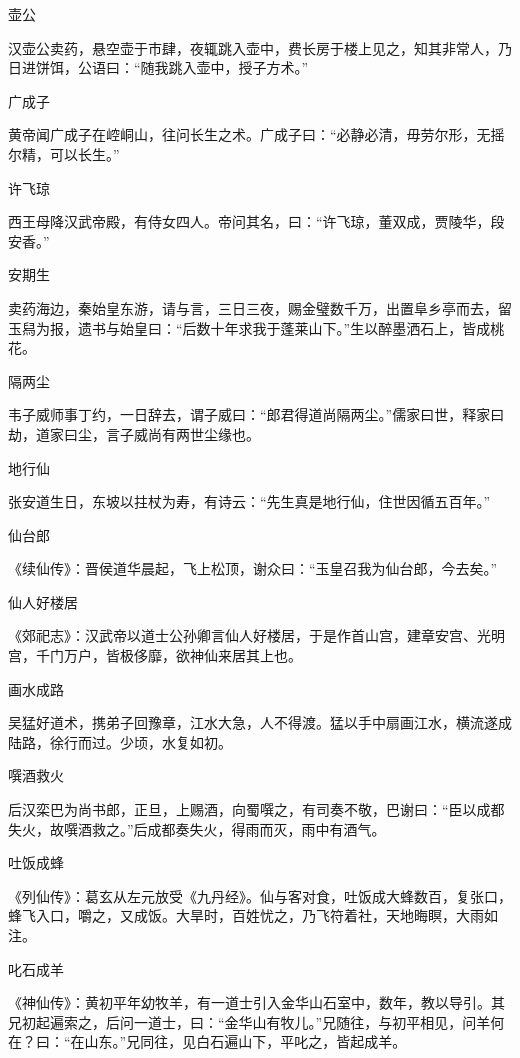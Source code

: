 \documentclass[a4paper,12pt,UTF8,twoside]{ctexbook}
\begin{document}
    壶公
    
    汉壶公卖药，悬空壶于市肆，夜辄跳入壶中，费长房于楼上见之，知其非常人，乃日进饼饵，公语曰：“随我跳入壶中，授子方术。”
    
    广成子
    
    黄帝闻广成子在崆峒山，往问长生之术。广成子曰：“必静必清，毋劳尔形，无摇尔精，可以长生。”
    
    许飞琼
    
    西王母降汉武帝殿，有侍女四人。帝问其名，曰：“许飞琼，董双成，贾陵华，段安香。”
    
    安期生
    
    卖药海边，秦始皇东游，请与言，三日三夜，赐金璧数千万，出置阜乡亭而去，留玉舄为报，遗书与始皇曰：“后数十年求我于蓬莱山下。”生以醉墨洒石上，皆成桃花。
    
    隔两尘
    
    韦子威师事丁约，一日辞去，谓子威曰：“郎君得道尚隔两尘。”儒家曰世，释家曰劫，道家曰尘，言子威尚有两世尘缘也。
    
    地行仙
    
    张安道生日，东坡以拄杖为寿，有诗云：“先生真是地行仙，住世因循五百年。”
    
    仙台郎
    
    《续仙传》：晋侯道华晨起，飞上松顶，谢众曰：“玉皇召我为仙台郎，今去矣。”
    
    仙人好楼居
    
    《郊祀志》：汉武帝以道士公孙卿言仙人好楼居，于是作首山宫，建章安宫、光明宫，千门万户，皆极侈靡，欲神仙来居其上也。
    
    画水成路
    
    吴猛好道术，携弟子回豫章，江水大急，人不得渡。猛以手中扇画江水，横流遂成陆路，徐行而过。少顷，水复如初。
    
    噀酒救火
    
    后汉栾巴为尚书郎，正旦，上赐酒，向蜀噀之，有司奏不敬，巴谢曰：“臣以成都失火，故噀酒救之。”后成都奏失火，得雨而灭，雨中有酒气。
    
    吐饭成蜂
    
    《列仙传》：葛玄从左元放受《九丹经》。仙与客对食，吐饭成大蜂数百，复张口，蜂飞入口，嚼之，又成饭。大旱时，百姓忧之，乃飞符着社，天地晦瞑，大雨如注。
    
    叱石成羊
    
    《神仙传》：黄初平年幼牧羊，有一道士引入金华山石室中，数年，教以导引。其兄初起遍索之，后问一道士，曰：“金华山有牧儿。”兄随往，与初平相见，问羊何在？曰：“在山东。”兄同往，见白石遍山下，平叱之，皆起成羊。
    
\end{document}

